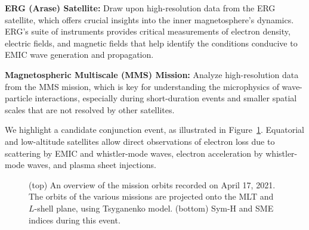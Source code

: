 \documentclass[
  letterpaper,
  DIV=11,
  numbers=noendperiod]{scrartcl}
\begin{document}
\textbf{ERG (Arase) Satellite:} Draw upon high-resolution data from the ERG satellite, which offers crucial insights into the inner magnetosphere's dynamics. ERG's suite of instruments provides critical measurements of electron density, electric fields, and magnetic fields that help identify the conditions conducive to EMIC wave generation and propagation.

\textbf{Magnetospheric Multiscale (MMS) Mission:} Analyze high-resolution data from the MMS mission, which is key for understanding the microphysics of wave-particle interactions, especially during short-duration events and smaller spatial scales that are not resolved by other satellites.

We highlight a candidate conjunction event, as illustrated in Figure~\ref{fig-1}. Equatorial and low-altitude satellites allow direct observations of electron loss due to scattering by EMIC and whistler-mode waves, electron acceleration by whistler-mode waves, and plasma sheet injections.

\begin{figure}


\caption{\label{fig-1}(top) An overview of the mission orbits recorded on April 17, 2021. The orbits of the various missions are projected onto the MLT and \(L\)-shell plane, using Tsyganenko model. (bottom) Sym-H and SME indices during this event.}

\end{figure}%
\end{document}
